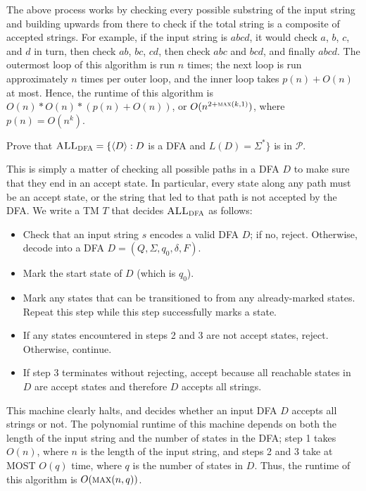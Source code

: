 \documentclass[solution, letterpaper]{cs121}
\begin{document}
\begin{solution}
The above process works by checking every possible substring of the input string and building upwards from there to check if the total string is a composite of accepted strings.  For example, if the input string is $abcd$, it would check $a$, $b$, $c$, and $d$ in turn, then check $ab$, $bc$, $cd$, then check $abc$ and $bcd$, and finally $abcd$.  The outermost loop of this algorithm is run $n$ times; the next loop is run approximately $n$ times per outer loop, and the inner loop takes $p(n) + O(n)$ at most.  Hence, the runtime of this algorithm is $O(n) * O(n) * (p(n) + O(n))$, or $O(n^{2+\textsc{max}(k, 1)})$, where $p(n) = O(n^k)$.

\end{solution}

Prove that $\textsc{ALL}_\textsc{DFA} = \{\langle D \rangle : D$ is a DFA and $L(D)=\Sigma^*\}$ is in $\mathcal{P}$.

\begin{solution}
This is simply a matter of checking all possible paths in a DFA $D$ to make sure that they end in an accept state.  In particular, every state along any path must be an accept state, or the string that led to that path is not accepted by the DFA.  We write a TM $T$ that decides $\textsc{ALL}_\textsc{DFA}$ as follows:

\begin{itemize}
	\setlength\itemsep{0cm}
	\item Check that an input string $s$ encodes a valid DFA $D$; if no, reject.  Otherwise, decode into a DFA $D = (Q, \Sigma, q_0, \delta, F)$.  
	\item Mark the start state of $D$ (which is $q_0$).
	\item Mark any states that can be transitioned to from any already-marked states.  Repeat this step while this step successfully marks a state.
	\item If any states encountered in steps 2 and 3 are not accept states, reject.  Otherwise, continue.
	\item If step 3 terminates without rejecting, accept because all reachable states in $D$ are accept states and therefore $D$ accepts all strings.
\end{itemize}

This machine clearly halts, and decides whether an input DFA $D$ accepts all strings or not.  The polynomial runtime of this machine depends on both the length of the input string and the number of states in the DFA; step 1 takes $O(n)$, where $n$ is the length of the input string, and steps 2 and 3 take at MOST $O(q)$ time, where $q$ is the number of states in $D$.  Thus, the runtime of this algorithm is $O(\textsc{max}(n,q))$.
\end{solution}
\end{document}

